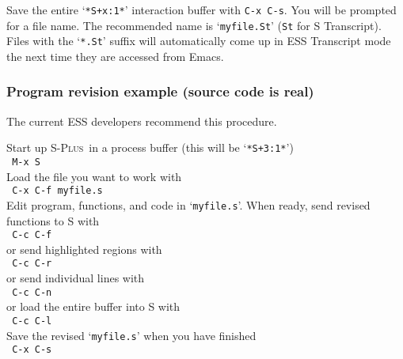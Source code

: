 \documentclass{article}
\newcommand*{\Splus}{\textsc{S-Plus}}
\newcommand{\stexttt}[1]{{\small\texttt{#1}}}
\newcommand{\elcode}[1]{\\{\stexttt{\hspace*{2em} #1}}\\}
\newcommand{\file}[1]{`\stexttt{#1}'}
\begin{document}
Save the entire \file{*S+x:1*} interaction buffer with \stexttt{C-x C-s}.
You will be prompted for a file name.  The recommended name is
\file{myfile.St} (\stexttt{St} for S Transcript).
Files with the \file{*.St} suffix will automatically come up in ESS
Transcript mode the next time they are accessed from Emacs.


\subsubsection{Program revision example (source code is real)}
The current ESS developers recommend this procedure.

\noindent
Start up \Splus\ in a process buffer (this will be \file{*S+3:1*})
  \elcode{M-x S}
Load the file you want to work with
  \elcode{C-x C-f myfile.s}
Edit program, functions, and code in \file{myfile.s}.
When ready, send revised functions to S with
  \elcode{C-c C-f}
or send highlighted regions with
  \elcode{C-c C-r}
or send individual lines with
  \elcode{C-c C-n}
or load the entire buffer into S with
  \elcode{C-c C-l}
Save the revised \file{myfile.s} when you have finished
  \elcode{C-x C-s}




\end{document}
